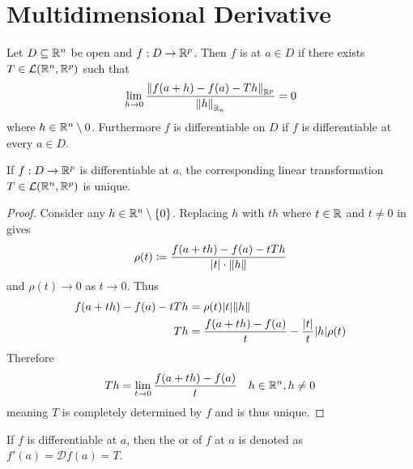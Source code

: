 \documentclass[../main.tex]{subfiles}
\begin{document}
\section[Derivatives I]{Multidimensional Derivative}

\begin{definition}[Differentiability]
    \label{def:differentiability}
    Let $D \subseteq \mathbb{R}^n$ be open and $f : D \to \mathbb{R}^p$. Then $f$ is  at $a \in D$ if there exists $T \in \mathcal{L}(\mathbb{R}^n, \mathbb{R}^p)$ such that
    \[
        \lim_{h \to 0} \frac{\norm{f(a + h) - f(a) - Th}_{\mathbb{R}^p}}{\norm{h}_{\mathbb{R}_n}} = 0
    \]
    where $h \in \mathbb{R}^n \setminus{0}$. Furthermore $f$ is differentiable on $D$ if $f$ is differentiable at every $a \in D$.
\end{definition}

\begin{theorem}
    \label{thm:uniquederivative}
    If $f : D \to \mathbb{R}^p$ is differentiable at $a$, the corresponding linear transformation $T \in \mathcal{L}(\mathbb{R}^n, \mathbb{R}^p)$ is unique.
\end{theorem}

\begin{proof}
    Consider any $h \in \mathbb{R}^n \setminus \qty{0}$. Replacing $h$ with $th$ where $t \in \mathbb{R}$ and $t \neq 0$ in  gives
    \[
        \rho(t) \coloneq \frac{f(a+th) - f(a) - tTh}{\qty|t| \cdot \norm{h}}
    \]
    and $\rho(t) \to 0$ as $t \to 0$. Thus
    \begin{align*}
        f(a+th) - f(a) - tTh &= \rho(t) \qty|t| \norm{h}  \\
        Th &= \frac{f(a+th) - f(a)}{t} - \frac{|t|}{t} |h| \rho(t)
    \end{align*}
    Therefore
    \[
        Th = \lim_{t \to 0} \frac{f(a+th) - f(a)}{t} \quad h \in \mathbb{R}^n, h \neq 0
    \]
    meaning $T$ is completely determined by $f$ and is thus unique.
\end{proof}

\begin{definition}[Differential]
    If $f$ is differentiable at $a$, then the  or  of $f$ at $a$ is denoted as $f'(a) = \mathcal{D} f(a) = T$.
\end{definition}
\end{document}
